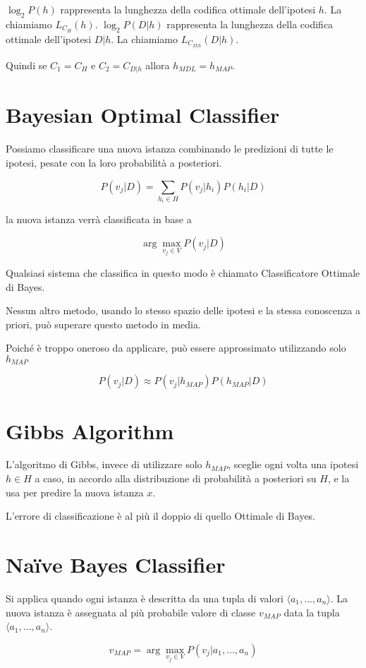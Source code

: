 \documentclass[11pt,onecolumn,a4paper,oneside]{book}
\begin{document}
$\log_{2} P(h)$ rappresenta la lunghezza della codifica ottimale dell'ipotesi $h$. La chiamiamo $L_{C_H}(h)$.
$\log_{2} P(D|h)$ rappresenta la lunghezza della codifica ottimale dell'ipotesi $D|h$. La chiamiamo $L_{C_{D|h}}(D|h)$.

Quindi se $C_1 = C_H$ e $C_2 = C_{D|h}$ allora $h_{MDL} = h_{MAP}$.


\section{Bayesian Optimal Classifier}
Possiamo classificare una nuova istanza combinando le predizioni di tutte le ipotesi, pesate con la loro probabilità a posteriori.

$$P(v_j | D ) = \sum_{h_i \in H} P(v_j | h_i)P(h_i | D)$$

la nuova istanza verrà classificata in base a

$$ \arg\max_{v_j \in V} P(v_j | D ) $$

Qualsiasi sistema che classifica in questo modo è chiamato Classificatore Ottimale di Bayes.

Nessun altro metodo, usando lo stesso spazio delle ipotesi e la stessa conoscenza a priori, può superare questo metodo in media.

Poiché è troppo oneroso da applicare, può essere approssimato utilizzando solo $h_{MAP}$

$$P(v_j | D ) \approx P(v_j | h_{MAP})P(h_{MAP} | D)$$


\section{Gibbs Algorithm}
L'algoritmo di Gibbs, invece di utilizzare solo $h_{MAP}$, sceglie ogni volta una ipotesi $h \in H$ a caso, in accordo alla distribuzione di probabilità a posteriori su $H$, e la usa per predire la nuova istanza $x$.

L'errore di classificazione è al più il doppio di quello Ottimale di Bayes.


\section{Na\"{i}ve Bayes Classifier}
Si applica quando ogni istanza è descritta da una tupla di valori $\langle a_1, \dots, a_n \rangle$.
La nuova istanza è assegnata al più probabile valore di classe $v_{MAP}$ data la tupla $\langle a_1, \dots, a_n \rangle$.

$$ v_{MAP} = \arg\max_{v_j \in V} P(v_j | a_1, \dots, a_n ) $$
\end{document}
